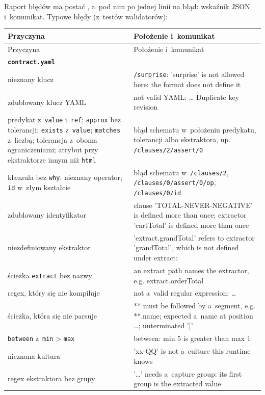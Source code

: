 Raport błędów ma postać , a~pod nim po jednej linii na błąd:
wskaźnik JSON i~komunikat. Typowe błędy (z~testów walidatorów):

{\footnotesize
\begin{xltabular}{\linewidth}{@{}>{\raggedright\arraybackslash}p{4.6cm} >{\raggedright\arraybackslash}X@{}}
\toprule
Przyczyna & Położenie i~komunikat \\
\midrule
\endfirsthead
\toprule
Przyczyna & Położenie i~komunikat \\
\midrule
\endhead
\bottomrule
\endlastfoot
\textbf{\texttt{contract.yaml}} & \\
nieznany klucz & \texttt{/surprise}: 'surprise' is not allowed here: the format does not
define it \\
zdublowany klucz YAML & not valid YAML: … Duplicate key revision \\
predykat z~\texttt{value} i~\texttt{ref}; \texttt{approx} bez tolerancji; \texttt{exists} z~\texttt{value}; \texttt{matches} z~liczbą; tolerancja z~oboma ograniczeniami; atrybut przy
ekstraktorze innym niż \texttt{html} & błąd schematu w~położeniu predykatu, tolerancji albo
ekstraktora, np. \texttt{/clauses/2/assert/0} \\
klauzula bez \texttt{why}; nieznany operator; \texttt{id} w~złym kształcie & błąd schematu w~\texttt{/clauses/2}, \texttt{/clauses/0/assert/0/op}, \texttt{/clauses/0/id} \\
zdublowany identyfikator & clause 'TOTAL-NEVER-NEGATIVE' is defined more than once;
extractor 'cartTotal' is defined more than once \\
niezdefiniowany ekstraktor & 'extract.grandTotal' refers to extractor 'grandTotal', which is
not defined under extract: \\
ścieżka \texttt{extract} bez nazwy & an extract path names the extractor, e.g.
extract.orderTotal \\
regex, który się nie kompiluje & not a~valid regular expression: … \\
ścieżka, która się nie parsuje & ** must be followed by a~segment, e.g. **.name; expected a~name at position …; unterminated '[' \\
\texttt{between} z~\texttt{min} > \texttt{max} & between: min 5 is greater than max 1 \\
nieznana kultura & 'xx-QQ' is not a~culture this runtime knows \\
regex ekstraktora bez grupy & '…' needs a~capture group: its first group is the extracted
value \\

\end{xltabular}}

